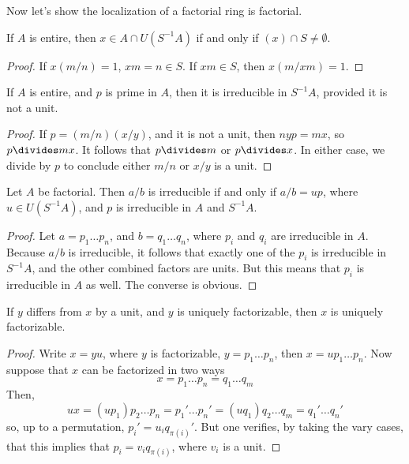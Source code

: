 Now let's show the localization of a factorial ring is factorial.

\begin{lemma}
    If $A$ is entire, then $x \in A \cap U(S^{-1}A)$ if and only if $(x) \cap S \neq \emptyset$.
\end{lemma}
\begin{proof}
    If $x (m/n) = 1$, $xm = n \in S$. If $xm \in S$, then $x (m/xm) = 1$.
\end{proof}

\begin{lemma}
    If $A$ is entire, and $p$ is prime in $A$, then it is irreducible in $S^{-1}A$, provided it is not a unit.
\end{lemma}
\begin{proof}
    If $p = (m/n)(x/y)$, and it is not a unit, then $nyp = mx$, so $p \divides mx$. It follows that $p \divides m$ or $p \divides x$. In either case, we divide by $p$ to conclude either $m/n$ or $x/y$ is a unit.
\end{proof}

\begin{lemma}
    Let $A$ be factorial. Then $a/b$ is irreducible if and only if $a/b = up$, where $u \in U(S^{-1}A)$, and $p$ is irreducible in $A$ and $S^{-1}A$.
\end{lemma}
\begin{proof}
     Let $a = p_1 \dots p_n$, and $b = q_1 \dots q_n$, where $p_i$ and $q_i$ are irreducible in $A$. Because $a/b$ is irreducible, it follows that exactly one of the $p_i$ is irreducible in $S^{-1}A$, and the other combined factors are units. But this means that $p_i$ is irreducible in $A$ as well. The converse is obvious.
\end{proof}

\begin{lemma}
    If $y$ differs from $x$ by a unit, and $y$ is uniquely factorizable, then $x$ is uniquely factorizable.
\end{lemma}
\begin{proof}
    Write $x = yu$, where $y$ is factorizable, $y = p_1 \dots p_n$, then $x = u p_1 \dots p_n$. Now suppose that $x$ can be factorized in two ways
    \[ x = p_1 \dots p_n = q_1 \dots q_m \]
    Then,
    \[ ux = (up_1) p_2 \dots p_n = p_1' \dots p_n' = (uq_1) q_2 \dots q_m = q_1' \dots q_n' \]
    so, up to a permutation, $p_i' = u_i q_{\pi(i)}'$. But one verifies, by taking the vary cases, that this implies that $p_i = v_i q_{\pi(i)}$, where $v_i$ is a unit.
\end{proof}


